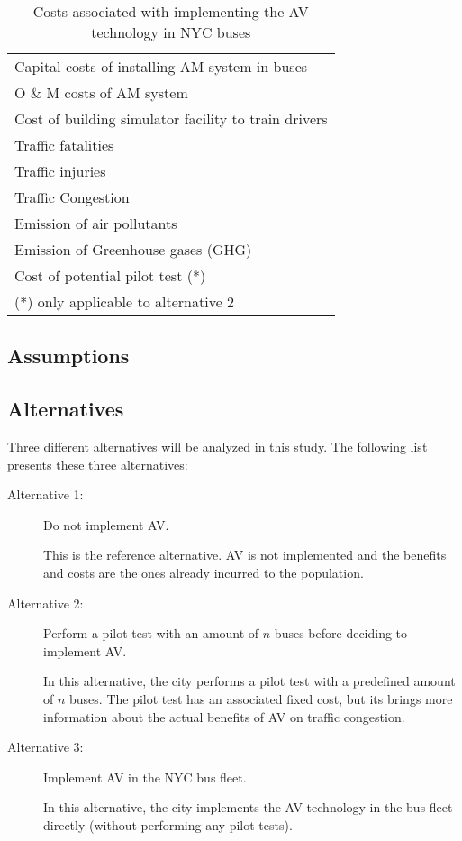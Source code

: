 \documentclass[11pt, letterpaper]{article}
\begin{document}
\begin{table}[h]
\caption{Costs associated with implementing the AV technology in NYC buses}
\begin{center}
\begin{tabular}{l}
\hline\hline
Capital costs of installing AM system in buses\\
O \& M costs of AM system \\
Cost of building simulator facility to train drivers \\
Traffic fatalities \\
Traffic injuries \\
Traffic Congestion \\
Emission of air pollutants \\
Emission of Greenhouse gases (GHG) \\
Cost of potential pilot test (*) \\
\hline\hline
{\footnotesize (*) only applicable to alternative 2}
\end{tabular}
\end{center}
\label{tab:bca.costs}
\end{table}%

\subsection{Assumptions}


\subsection{Alternatives}

Three different alternatives will be analyzed in this study. The following list presents these three alternatives:

\begin{description}%
\item[Alternative 1:] Do not implement AV.

This is the reference alternative. AV is not implemented and the benefits and costs are the ones already incurred to the population.

\item[Alternative 2:] Perform a pilot test with an amount of $n$ buses before deciding to implement AV.

In this alternative, the city performs a pilot test with a predefined amount of $n$ buses. The pilot test has an associated fixed cost, but its brings more information about the actual benefits of AV on traffic congestion. 

\item[Alternative 3:] Implement AV in the NYC bus fleet.

In this alternative, the city implements the AV technology in the bus fleet directly (without performing any pilot tests).

\end{description}
\end{document}
